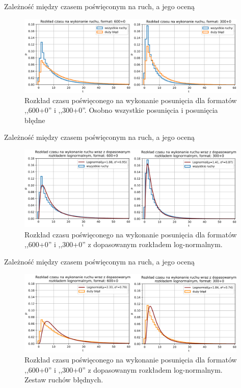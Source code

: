 \documentclass{beamer}
\begin{document}
\begin{frame}{Zależność między czasem poświęconym na ruch, a jego oceną}
\begin{figure}[H]
	\centering
	\includegraphics[width=11cm]{../Formatka/rozklad_czasu.png}
	\caption{Rozkład czasu poświęconego na wykonanie posunięcia dla formatów ,,600+0'' i ,,300+0''. Osobno wszystkie posunięcia i posunięcia błędne}
	\label{rys:rozklad_czasu}
\end{figure}
\end{frame}

\begin{frame}{Zależność między czasem poświęconym na ruch, a jego oceną}
	\begin{figure}[H]
		\centering
		\includegraphics[width=11cm]{../Formatka/rozklad_lognorm.png}
		\caption{Rozkład czasu poświęconego na wykonanie posunięcia dla formatów ,,600+0'' i ,,300+0'' z dopasowanym rozkładem log-normalnym.}
		\label{rys:rozklad_lognorm}
	\end{figure}
\end{frame}
\begin{frame}{Zależność między czasem poświęconym na ruch, a jego oceną}
	\begin{figure}[H]
		\centering
		\includegraphics[width=11cm]{../Formatka/rozklad_lognorm2.png}
		\caption{Rozkład czasu poświęconego na wykonanie posunięcia dla formatów ,,600+0'' i ,,300+0'' z dopasowanym rozkładem log-normalnym. Zestaw ruchów błędnych.}
		\label{rys:rozklad_lognorm2}
	\end{figure}
\end{frame}
\end{document}
